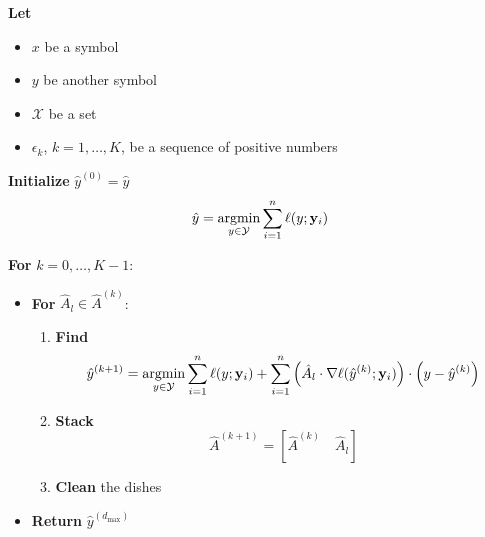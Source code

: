 \textbf{Let}
\begin{itemize}
	\item \(x\) be a symbol
	\item \(y\) be another symbol
	\item \(\mathcal{X}\) be a set
	\item \(\epsilon_k\), \(k=1,\dots,K\), be a sequence of positive numbers
\end{itemize}

\textbf{Initialize} \(\hat{y}^{(0)} = \hat{y}\)
%
\[
	\hat{y} = \argmin_{y \in \mathcal{Y}} \sum_{i=1}^n \ell(y;\by_i)
\]
%

\textbf{For} \(k = 0,\dots,K-1\):
\begin{itemize}
	\item[] \textbf{For} \(\hat{A}_l \in \hat{A}^{(k)}\):
	\begin{enumerate}
		\item \textbf{Find}
		\[
			\hat{y}^{(k+1)} = \argmin_{y \in \mathcal{Y}} \sum_{i=1}^n \ell(y;\by_i) + \sum_{i=1}^n \left( \hat{A}_l \cdot \nabla \ell(\hat{y}^{(k)};\by_i) \right) \cdot \left( y - \hat{y}^{(k)} \right)
		\]
		\item \textbf{Stack}
		\[
			\hat{A}^{(k+1)} = \left[ \hat{A}^{(k)} \quad \hat{A}_l \right]
		\]

		\item \textbf{Clean} the dishes
	\end{enumerate}

	\item[] \textbf{Return} \(\hat{y}^{(d_{\max})}\)
\end{itemize}

